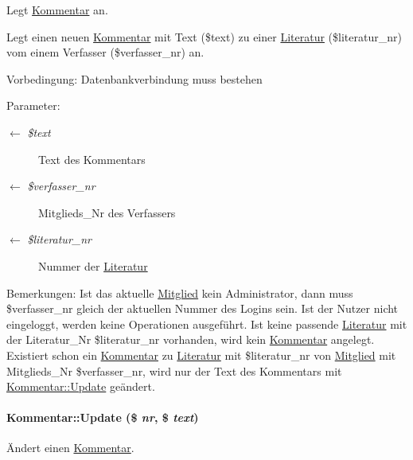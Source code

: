 Legt \hyperlink{classKommentar}{Kommentar} an. 

Legt einen neuen \hyperlink{classKommentar}{Kommentar} mit Text (\$text) zu einer \hyperlink{classLiteratur}{Literatur} (\$literatur\_\-nr) vom einem Verfasser (\$verfasser\_\-nr) an. \begin{Desc}
\item[Vorbedingung:]Datenbankverbindung muss bestehen \end{Desc}
\begin{Desc}
\item[Parameter:]
\begin{description}
\item[\mbox{$\leftarrow$} {\em \$text}]Text des Kommentars \item[\mbox{$\leftarrow$} {\em \$verfasser\_\-nr}]Mitglieds\_\-Nr des Verfassers \item[\mbox{$\leftarrow$} {\em \$literatur\_\-nr}]Nummer der \hyperlink{classLiteratur}{Literatur} \end{description}
\end{Desc}
\begin{Desc}
\item[Bemerkungen:]Ist das aktuelle \hyperlink{classMitglied}{Mitglied} kein Administrator, dann muss \$verfasser\_\-nr gleich der aktuellen Nummer des Logins sein. Ist der Nutzer nicht eingeloggt, werden keine Operationen ausgeführt. Ist keine passende \hyperlink{classLiteratur}{Literatur} mit der Literatur\_\-Nr \$literatur\_\-nr vorhanden, wird kein \hyperlink{classKommentar}{Kommentar} angelegt. Existiert schon ein \hyperlink{classKommentar}{Kommentar} zu \hyperlink{classLiteratur}{Literatur} mit \$literatur\_\-nr von \hyperlink{classMitglied}{Mitglied} mit Mitglieds\_\-Nr \$verfasser\_\-nr, wird nur der Text des Kommentars mit \hyperlink{classKommentar_0b3e20e910493e67b67b747243f04511}{Kommentar::Update} geändert. \end{Desc}
\hypertarget{classKommentar_0b3e20e910493e67b67b747243f04511}{
\paragraph[Update]{\setlength{\rightskip}{0pt plus 5cm}Kommentar::Update (\$ {\em nr}, \$ {\em text})}\hfill}
\label{classKommentar_0b3e20e910493e67b67b747243f04511}


Ändert einen \hyperlink{classKommentar}{Kommentar}. 

